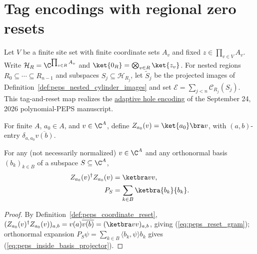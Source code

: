 \section{Tag encodings with regional zero resets}
\label{sec:peps_hole_encoder}

Let $V$ be a finite site set with finite coordinate sets $A_v$ and fixed
$z\in\prod_{v\in V}A_v$. Write $\mathcal H_R=\C^{\prod_{v\in R}A_v}$ and
$\ket{0_R}=\bigotimes_{v\in R}\ket{z_v}$. For nested regions
$R_0\subseteq\cdots\subseteq R_{n-1}$ and subspaces $S_j\subseteq\mathcal H_{R_j}$,
let $\widetilde S_j$ be the projected images of
Definition~\ref{def:peps_nested_cylinder_images} and set
$\mathcal E=\sum_{j<n}\mathcal C_{R_j}(S_j)$. This tag-and-reset map realizes the
\href{https://github.com/openai/math/blob/adc7f1241b42e322a6451854ab7e4b4c146bf78a/preprints/Polynomial-PEPS-approximation-of-gapped-square-grid-ground-states-September-24-2026/build/sections/05-frames.tex\#L50-L69}{adaptive hole encoding}
of the September 24, 2026 polynomial-PEPS manuscript.

\begin{definition}
    \label{def:peps_coordinate_reset}
    \leanok
    For finite $A$, $a_0\in A$, and $v\in\C^A$, define
    $Z_{a_0}(v)=\ket{a_0}\bra v$, with $(a,b)$-entry
    $\delta_{a,a_0}\overline{v(b)}$.
\end{definition}

\begin{lemma}
    \label{thm:peps_coordinate_reset_gram}
    \leanok
    For any (not necessarily normalized) $v\in\C^A$ and any orthonormal basis
    $(b_k)_{k\in B}$ of a subspace $S\subseteq\C^A$,
    \begin{align}
        Z_{a_0}(v)^\dagger Z_{a_0}(v) & =\ketbra v v,
        \label{eq:peps_reset_gram}                                       \\
        P_S                           & =\sum_{k\in B}\ketbra{b_k}{b_k}.
        \label{eq:peps_inside_basis_projector}
    \end{align}
\end{lemma}
\begin{proof}
    \leanok
    By Definition~\ref{def:peps_coordinate_reset},
    $(Z_{a_0}(v)^\dagger Z_{a_0}(v))_{a,b}=v(a)\overline{v(b)}=(\ketbra v v)_{a,b}$,
    giving (\ref{eq:peps_reset_gram}); orthonormal expansion
    $P_S\psi=\sum_{k\in B}\langle b_k,\psi\rangle b_k$ gives
    (\ref{eq:peps_inside_basis_projector}).
\end{proof}

